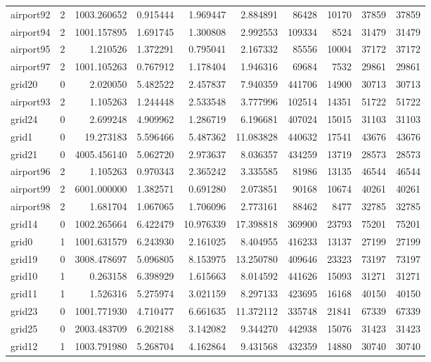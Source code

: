 \begin{longtable}{|l|r|r|r|r|r|r|r|r|r|}
airport92 & 2 & 1003.260652 & 0.915444 & 1.969447 & 2.884891 & 86428 & 10170 & 37859 & 37859 \\
airport94 & 2 & 1001.157895 & 1.691745 & 1.300808 & 2.992553 & 109334 & 8524 & 31479 & 31479 \\
airport95 & 2 & 1.210526 & 1.372291 & 0.795041 & 2.167332 & 85556 & 10004 & 37172 & 37172 \\
airport97 & 2 & 1001.105263 & 0.767912 & 1.178404 & 1.946316 & 69684 & 7532 & 29861 & 29861 \\
grid20 & 0 & 2.020050 & 5.482522 & 2.457837 & 7.940359 & 441706 & 14900 & 30713 & 30713 \\
airport93 & 2 & 1.105263 & 1.244448 & 2.533548 & 3.777996 & 102514 & 14351 & 51722 & 51722 \\
grid24 & 0 & 2.699248 & 4.909962 & 1.286719 & 6.196681 & 407024 & 15015 & 31103 & 31103 \\
grid1 & 0 & 19.273183 & 5.596466 & 5.487362 & 11.083828 & 440632 & 17541 & 43676 & 43676 \\
grid21 & 0 & 4005.456140 & 5.062720 & 2.973637 & 8.036357 & 434259 & 13719 & 28573 & 28573 \\
airport96 & 2 & 1.105263 & 0.970343 & 2.365242 & 3.335585 & 81986 & 13135 & 46544 & 46544 \\
airport99 & 2 & 6001.000000 & 1.382571 & 0.691280 & 2.073851 & 90168 & 10674 & 40261 & 40261 \\
airport98 & 2 & 1.681704 & 1.067065 & 1.706096 & 2.773161 & 88462 & 8477 & 32785 & 32785 \\
grid14 & 0 & 1002.265664 & 6.422479 & 10.976339 & 17.398818 & 369900 & 23793 & 75201 & 75201 \\
grid0 & 1 & 1001.631579 & 6.243930 & 2.161025 & 8.404955 & 416233 & 13137 & 27199 & 27199 \\
grid19 & 0 & 3008.478697 & 5.096805 & 8.153975 & 13.250780 & 409646 & 23323 & 73197 & 73197 \\
grid10 & 1 & 0.263158 & 6.398929 & 1.615663 & 8.014592 & 441626 & 15093 & 31271 & 31271 \\
grid11 & 1 & 1.526316 & 5.275974 & 3.021159 & 8.297133 & 423695 & 16168 & 40150 & 40150 \\
grid23 & 0 & 1001.771930 & 4.710477 & 6.661635 & 11.372112 & 335748 & 21841 & 67339 & 67339 \\
grid25 & 0 & 2003.483709 & 6.202188 & 3.142082 & 9.344270 & 442938 & 15076 & 31423 & 31423 \\
grid12 & 1 & 1003.791980 & 5.268704 & 4.162864 & 9.431568 & 432359 & 14880 & 30740 & 30740 \\

\end{longtable}
